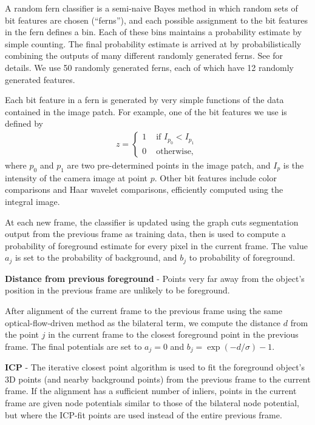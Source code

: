\documentclass[graybox]{svmult}
\begin{document}
A random fern classifier is a semi-naive Bayes method in which random sets of bit features are chosen (``ferns''), and each possible assignment to the bit features in the fern defines a bin.  Each of these bins maintains a probability estimate by simple counting.  The final probability estimate is arrived at by probabilistically combining the outputs of many different randomly generated ferns.  See \cite{ozuysal2007a} for details.  We use 50 randomly generated ferns, each of which have 12 randomly generated features.

Each bit feature in a fern is generated by very simple functions of the data contained in the image patch.  For example, one of the bit features we use is defined by
\begin{align*}
  z =
  \left\{
  \begin{array}{rl}
    1 & \mbox{ if } I_{p_0} < I_{p_1} \\
    0 & \mbox{ otherwise, }
  \end{array}
  \right.
\end{align*}
where $p_0$ and $p_1$ are two pre-determined points in the image patch, and $I_p$ is the intensity of the camera image at point $p$.  Other bit features include color comparisons and Haar wavelet comparisons, efficiently computed using the integral image.

At each new frame, the classifier is updated using the graph cuts segmentation output from the previous frame as training data, then is used to compute a probability of foreground estimate for every pixel in the current frame. The value $a_j$ is set to the probability of background, and $b_j$ to probability of foreground.

\textbf{Distance from previous foreground} - Points very far away from the object's position in the previous frame are unlikely to be foreground.

After alignment of the current frame to the previous frame using the same optical-flow-driven method as the bilateral term, we compute the distance $d$ from the point $j$ in the current frame to the closest foreground point in the previous frame.  The final potentials are set to $a_j = 0$ and $b_j = \exp(-d / \sigma) - 1$.

\textbf{ICP} - The iterative closest point algorithm is used to fit the foreground object's 3D points (and nearby background points) from the previous frame to the current frame.  If the alignment has a sufficient number of inliers, points in the current frame are given node potentials similar to those of the bilateral node potential, but where the ICP-fit points are used instead of the entire previous frame.
\end{document}
